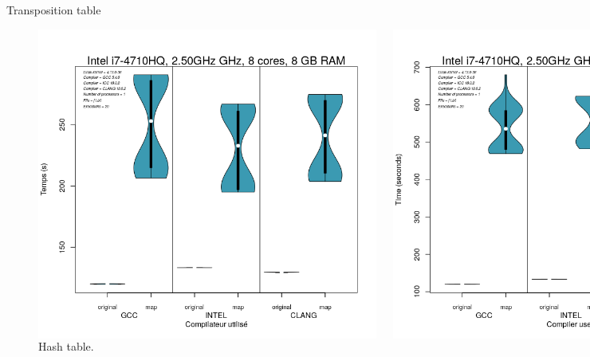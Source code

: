 \documentclass{beamer}
\begin{document}
\begin{frame}{Transposition table}
	\begin{figure}
	\begin{columns}
      \includegraphics[width=\textwidth]{sorted_map.png}
      \caption{Binary search tree.\label{Fig:arbre_binaire}}
      \includegraphics[width=\textwidth]{unsorted_map.png}
      \caption{Hash table.\label{Fig:arbre_binaire}}
    \end{columns}	
	\end{figure}
\end{frame}
\end{document}
